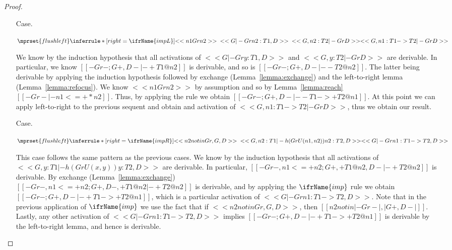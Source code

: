 \begin{proof}
\begin{itemize}
  \item[Case.]\ \\ 
    \begin{center}
      \begin{math}
        $$\mprset{flushleft}
        \inferrule* [right=\ifrName{impL}] {
          <<n1 Gr n2>>
          \\\\
          <<G |- Gr n2 : T1, D>>
          \\\\
          <<G, n2 : T2 |- Gr D>>
        }{<<G , n1 : T1 -> T2 |- Gr D>>}
      \end{math}
    \end{center}   
    We know by the induction hypothesis that all activations of $<<G |- Gr y : T1, D>>$ and 
    $<<G, y : T2 |- Gr D>>$ are derivable.  In particular, we know 
    $[[-Gr-;{G}+,{D}- |- +{T1}@n2]]$ is derivable, and so is $[[-Gr-;{G}+, {D}- |- -{T2}@n2]]$. The latter
    being derivable by applying the induction hypothesis followed by exchange 
    (Lemma~\ref{lemma:exchange}) and the left-to-right lemma (Lemma~\ref{lemma:refocus}). We know $<<n1 Gr n2>>$ by assumption
    and so by Lemma~\ref{lemma:reach} $[[-Gr- |- n1 <=+* n2]]$.  Thus, by applying the  rule we obtain
    $[[-Gr-;{G}+,{D}- |- - {T1}->+{T2} @ n1]]$.  At this point we can apply left-to-right to the previous sequent and obtain 
    and activation of $<<G , n1 : T1 -> T2 |- Gr D>>$, thus we obtain our result.

  \item[Case.]\ \\ 
    \begin{center}
      \begin{math}
        $$\mprset{flushleft}
        \inferrule* [right=\ifrName{impR}] {
          <<n2 notin Gr, G, D>>
          \\\\
          <<G, n2 : T1 |- h(Gr U {(n1,n2)}) n2 : T2, D>>
        }{<<G |- Gr n1 : T1 -> T2, D>>}
      \end{math}
    \end{center}
    This case follows the same pattern as the previous cases.  We know by the induction hypothesis
    that all activations of $<<G, y : T1 |- h(Gr U {(x,y)}) y : T2, D>>$ are derivable.  In particular,
    $[[-Gr-,n1 <=+ n2 ; {G}+, +{T1}@n2,{D}- |- +{T2}@n2]]$ is derivable.  By exchange (Lemma~\ref{lemma:exchange})\\
    $[[-Gr-,n1 <=+ n2 ; {G}+, {D}-,+{T1}@n2 |- +{T2}@n2]]$ is derivable, and by applying the $\ifrName{imp}$ rule
    we obtain $[[-Gr- ; {G}+, {D}- |- + {T1} ->+ {T2}@n1]]$, which is a particular activation of 
    $<<G |- Gr n1 : T1 -> T2, D>>$.  Note that in the previous application of $\ifrName{imp}$ we use
    the fact that if $<<n2 notin Gr, G, D>>$, then $[[n2 notin |-Gr-|,|{G}+,{D}-|]]$. 
    Lastly, any other activation of $<<G |- Gr n1 : T1 -> T2, D>>$ implies
    $[[-Gr- ; {G}+, {D}- |- + {T1} ->+ {T2}@n1]]$ is derivable by the left-to-right lemma, and hence is derivable.


\end{itemize}
\end{proof}
